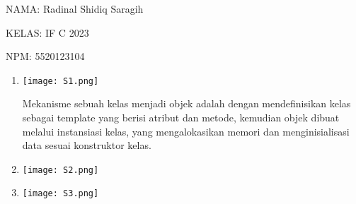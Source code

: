 \documentclass[8pt,a4paper]{article}
\date{}
\newcommand{\lstinputwithcaption}[2]{%
}
\begin{document}
      NAMA: Radinal Shidiq Saragih

      KELAS: IF C 2023

      NPM: 5520123104

\begin{enumerate}
   
  \item 
    \begin{multicols}{2}
            \begin{center}

              \lstinputwithcaption{./code/src/soal1/Main.java}{Main.java}


              \lstinputwithcaption{./code/src/soal1/Hewan.java}{Hewan.java}

              \columnbreak

              \texttt{[image: S1.png]}

            \end{center}

              Mekanisme sebuah kelas menjadi objek adalah dengan
              mendefinisikan kelas sebagai template yang berisi atribut
              dan metode, kemudian objek dibuat melalui instansiasi kelas,
              yang mengalokasikan memori dan menginisialisasi data sesuai
              konstruktor kelas.

    \end{multicols}

  \item
    \begin{multicols}{2}
            \begin{center}

              \lstinputwithcaption{./code/src/soal2/Main.java}{Main.java}

              \columnbreak

              \texttt{[image: S2.png]}

            \end{center}
    \end{multicols}

  \item
    \begin{multicols}{2}
            \begin{center}

              \lstinputwithcaption{./code/src/soal3/Main.java}{Main.java}
              
              \columnbreak


              \texttt{[image: S3.png]}


\end{center}
\end{multicols}
\end{enumerate}
\end{document}
